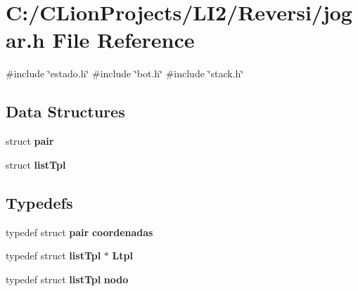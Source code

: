 \section{C\+:/\+C\+Lion\+Projects/\+L\+I2/\+Reversi/jogar.h File Reference}
\label{jogar_8h}
{\ttfamily \#include \char`\"{}estado.\+h\char`\"{}}\newline
{\ttfamily \#include \char`\"{}bot.\+h\char`\"{}}\newline
{\ttfamily \#include \char`\"{}stack.\+h\char`\"{}}\newline
\subsection*{Data Structures}
\begin{DoxyCompactItemize}
\item 
struct \textbf{ pair}
\item 
struct \textbf{ list\+Tpl}
\end{DoxyCompactItemize}
\subsection*{Typedefs}
\begin{DoxyCompactItemize}
\item 
typedef struct \textbf{ pair} \textbf{ coordenadas}
\item 
typedef struct \textbf{ list\+Tpl} $\ast$ \textbf{ Ltpl}
\item 
typedef struct \textbf{ list\+Tpl} \textbf{ nodo}
\end{DoxyCompactItemize}
